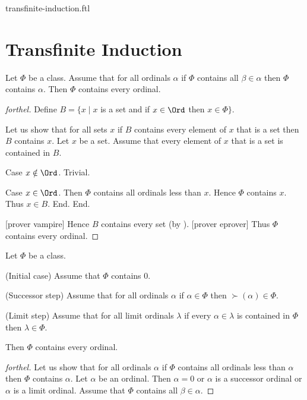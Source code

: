 \documentclass{naproche-library}
\begin{document}
\begin{smodule}{transfinite-induction.ftl}

  \section*{Transfinite Induction}

  \begin{theorem}[forthel,id=SET_THEORY_02_8493935460614144]
    Let $\Phi$ be a class.
    Assume that for all ordinals $\alpha$ if $\Phi$ contains all $\beta \in \alpha$ then $\Phi$ contains $\alpha$.
    Then $\Phi$ contains every ordinal.
  \end{theorem}
  \begin{proof}[forthel]
    Define $B = \{ x \mid x$ is a set and if $x \in \Ord$ then $x \in \Phi \}$.

    Let us show that for all sets $x$ if $B$ contains every element of $x$ that is a set then $B$ contains $x$.
      Let $x$ be a set.
      Assume that every element of $x$ that is a set is contained in $B$.

      Case $x \notin \Ord$. Trivial.

      Case $x \in \Ord$.
        Then $\Phi$ contains all ordinals less than $x$.
        Hence $\Phi$ contains $x$.
        Thus $x \in B$.
      End.
    End.

    [prover vampire]
    Hence $B$ contains every set (by ).
    [prover eprover]
    Thus $\Phi$ contains every ordinal.
  \end{proof}

  \begin{theorem}[forthel,id=SET_THEORY_02_7892040431960064]
    Let $\Phi$ be a class.
    
    (Initial case) Assume that $\Phi$ contains $0$.
    
    (Successor step) Assume that for all ordinals $\alpha$ if $\alpha \in \Phi$ then $\succ(\alpha) \in \Phi$.
    
    (Limit step) Assume that for all limit ordinals $\lambda$ if every $\alpha \in \lambda$ is contained in $\Phi$ then $\lambda \in \Phi$.
    
    Then $\Phi$ contains every ordinal.
  \end{theorem}
  \begin{proof}[forthel]
    Let us show that for all ordinals $\alpha$ if $\Phi$ contains all ordinals
    less than $\alpha$ then $\Phi$ contains $\alpha$.
      Let $\alpha$ be an ordinal.
      Then $\alpha = 0$ or $\alpha$ is a successor ordinal or $\alpha$ is a
      limit ordinal.
      Assume that $\Phi$ contains all $\beta \in \alpha$.


\end{proof}
\end{smodule}
\end{document}

